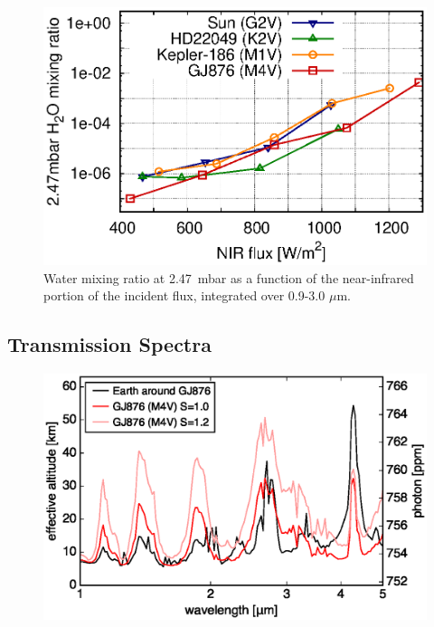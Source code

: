 \documentclass[11pt,numberedappendix,twocolappendix,]{emulateapj}
\def\preslevel{2.47}
\begin{document}
\begin{figure}[!h]
    \begin{center}
    \includegraphics[width=\hsize]{fig/AqOH0TLS_FNIR_xH2O_247mbar.eps}
    \end{center}
\caption{Water mixing ratio at \preslevel ~mbar as a function of the near-infrared portion of the incident flux, integrated over 0.9-3.0 $\mu $m. }                                                                                                             
\label{fig:qOH0TLS_FNIR_xH2O_247mbar}
\end{figure}

\subsection{Transmission Spectra}
\label{ss:result_TransmissionSpectra}

\begin{figure}[!h]
    \begin{center}
    \includegraphics[width=\hsize]{fig/transmission.eps}
    \end{center}
\caption{}                                                                                                             
\label{fig:transmission}
\end{figure}
\end{document}
